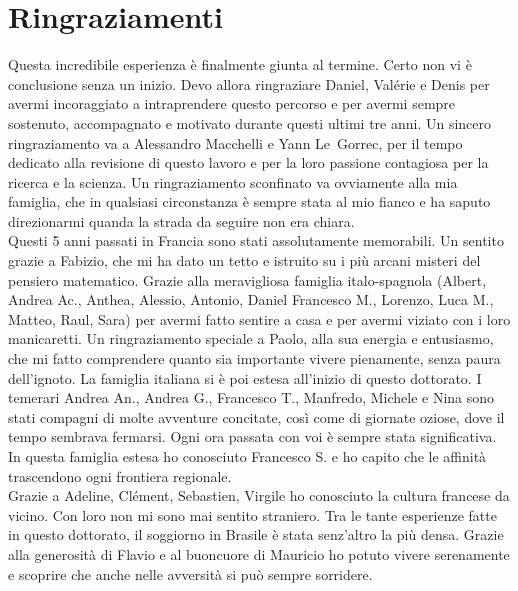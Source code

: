\chapter*{Ringraziamenti}

Questa incredibile esperienza è finalmente giunta al termine. Certo non vi è conclusione senza un inizio. Devo allora ringraziare Daniel, Valérie e Denis per avermi incoraggiato a intraprendere questo percorso e per avermi sempre sostenuto, accompagnato e motivato durante questi ultimi tre anni. Un sincero ringraziamento va a Alessandro Macchelli e Yann Le~Gorrec, per il tempo dedicato alla revisione di questo lavoro e per la loro passione contagiosa per la ricerca e la scienza. Un ringraziamento sconfinato va ovviamente alla mia famiglia, che in qualsiasi circonstanza è sempre stata al mio fianco e ha saputo direzionarmi quanda la strada da seguire non era chiara. \\ 

Questi 5 anni passati in Francia sono stati assolutamente memorabili. Un sentito grazie a Fabizio, che mi ha dato un tetto e istruito su i più arcani misteri del pensiero matematico. Grazie alla meravigliosa famiglia italo-spagnola (Albert, Andrea Ac., Anthea, Alessio, Antonio, Daniel Francesco M., Lorenzo, Luca M., Matteo, Raul, Sara) per avermi fatto sentire a casa e per avermi viziato con i loro manicaretti. Un ringraziamento speciale a Paolo, alla sua energia e entusiasmo, che mi fatto comprendere quanto sia importante vivere pienamente, senza paura dell'ignoto. La famiglia italiana si è poi estesa all'inizio di questo dottorato. I temerari Andrea An., Andrea G., Francesco T., Manfredo, Michele e Nina sono stati compagni di molte avventure concitate, così come di giornate oziose, dove il tempo sembrava fermarsi. Ogni ora passata con voi è sempre stata  significativa. In questa famiglia estesa ho conosciuto Francesco S. e ho capito che le affinità trascendono ogni frontiera regionale. \\

Grazie a Adeline, Clément, Sebastien, Virgile ho conosciuto la cultura francese da vicino. Con loro non mi sono mai sentito straniero. Tra le tante esperienze fatte in questo dottorato, il soggiorno in Brasile è stata senz'altro la più densa. Grazie alla generosità di Flavio e al buoncuore di Mauricio ho potuto vivere serenamente e scoprire che anche nelle avversità si può sempre sorridere. \\

